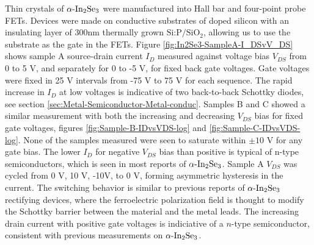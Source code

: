 Thin crystals of $\textrm{\ensuremath{\alpha}-In}_{2}\textrm{Se}_{3}$
were manufactured into Hall bar and four-point probe FETs. Devices
were made on conductive substrates of doped silicon with an insulating
layer of 300nm thermally grown $\textrm{Si:P/Si}\textrm{O}_{2}$,
allowing us to use the substrate as the gate in the FETs. Figure \ref{fig:In2Se3-SampleA-I_DSvV_DS}
shows sample A source-drain current $I_{D}$ measured against voltage
bias $V_{DS}$ from 0 to 5 V, and separately for 0 to -5 V, for fixed
back gate voltages. Gate voltages were fixed in 25 V intervals from
-75 V to 75 V for each sequence. The rapid increase in $I_{D}$ at
low voltages is indicative of two back-to-back Schottky diodes, see
section \ref{sec:Metal-Semiconductor-Metal-conduc}. Samples B and
C showed a similar measurement with both the increasing and decreasing
$V_{DS}$ bias for fixed gate voltages, figures \ref{fig:Sample-B-IDvsVDS-log}
and \ref{fig:Sample-C-IDvsVDS-log}. None of the samples measured
were seen to saturate within $\pm10$ V for any gate bias. The lower
$I_{D}$ for negative $V_{DS}$ bias than positive is typical of n-type
semiconductors, which is seen in most reports of $\textrm{\ensuremath{\alpha}-In}_{2}\textrm{Se}_{3}$\citep{island2015gate,julien1986electrical}.
Sample A $V_{DS}$ was cycled from 0 V, 10 V, -10V, to 0 V, forming
asymmetric hysteresis in the current. The switching behavior is similar
to previous reports of $\textrm{\ensuremath{\alpha}-In}_{2}\textrm{Se}_{3}$
rectifying devices, where the ferroelectric polarization field is
thought to modify the Schottky barrier between the material and the
metal leads.\citep{yang2019nonvolatile,wan2018roomtemperature,cui2018intercorrelated,dai2020intrinsic}
The increasing drain current with positive gate voltages is indiciative
of a $n$-type semiconductor\citep{horowitz2015art}, consistent with
previous measurements on $\textrm{\ensuremath{\alpha}-In}_{2}\textrm{Se}_{3}$\citep{julien1986electrical,island2015gate}.

